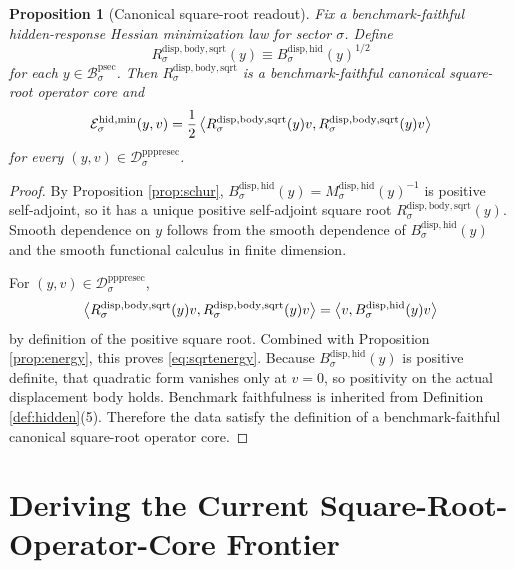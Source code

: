 \documentclass[11pt]{article}
\newcommand{\ProtoSectionBody}[1]{\mathcal B_{#1}^{\mathrm{psec}}}
\newcommand{\PrePreProtoSectionResidualBody}[1]{\mathcal D_{#1}^{\mathrm{pppresec}}}
\newcommand{\SquareRootOperator}[1]{R_{#1}^{\mathrm{disp,body,sqrt}}}
\newcommand{\ReducedSchur}[1]{M_{#1}^{\mathrm{disp,hid}}}
\newcommand{\ReducedCoreOperator}[1]{B_{#1}^{\mathrm{disp,hid}}}
\newtheorem{proposition}{Proposition}
\begin{document}
\begin{proposition}[Canonical square-root readout]
\label{prop:sqrt}
Fix a benchmark-faithful hidden-response Hessian minimization law for sector \(\sigma\). Define
\begin{equation}
\SquareRootOperator{\sigma}(y)
\equiv
\ReducedCoreOperator{\sigma}(y)^{1/2}
\label{eq:sqrt}
\end{equation}
for each \(y\in\ProtoSectionBody{\sigma}\). Then \(\SquareRootOperator{\sigma}\) is a benchmark-faithful canonical square-root operator core and
\begin{equation}
\mathcal E_{\sigma}^{\mathrm{hid,min}}(y,v)
=
\frac{1}{2}
\ev{
\SquareRootOperator{\sigma}(y)v,
\SquareRootOperator{\sigma}(y)v
}
\label{eq:sqrtenergy}
\end{equation}
for every \((y,v)\in\PrePreProtoSectionResidualBody{\sigma}\).
\end{proposition}

\begin{proof}
By Proposition \ref{prop:schur}, \(\ReducedCoreOperator{\sigma}(y)=\ReducedSchur{\sigma}(y)^{-1}\) is positive self-adjoint, so it has a unique positive self-adjoint square root \(\SquareRootOperator{\sigma}(y)\). Smooth dependence on \(y\) follows from the smooth dependence of \(\ReducedCoreOperator{\sigma}(y)\) and the smooth functional calculus in finite dimension.

For \((y,v)\in\PrePreProtoSectionResidualBody{\sigma}\),
\[
\ev{
\SquareRootOperator{\sigma}(y)v,
\SquareRootOperator{\sigma}(y)v
}
=
\ev{
v,\ReducedCoreOperator{\sigma}(y)v
}
\]
by definition of the positive square root. Combined with Proposition \ref{prop:energy}, this proves \eqref{eq:sqrtenergy}. Because \(\ReducedCoreOperator{\sigma}(y)\) is positive definite, that quadratic form vanishes only at \(v=0\), so positivity on the actual displacement body holds. Benchmark faithfulness is inherited from Definition \ref{def:hidden}(5). Therefore the data satisfy the definition of a benchmark-faithful canonical square-root operator core.
\end{proof}

\section{Deriving the Current Square-Root-Operator-Core Frontier}
\end{document}
